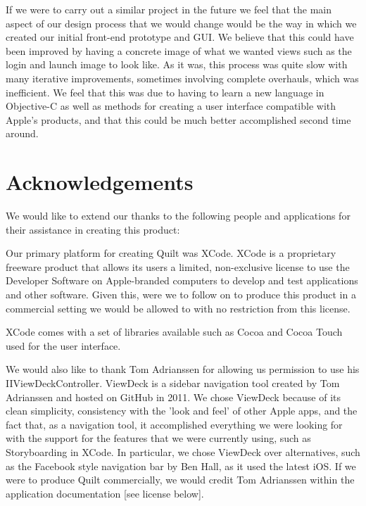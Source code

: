 \documentclass[a4wide, 10pt]{article}
\begin{document}
If we were to carry out a similar project in the future we feel that the main aspect of our design process that we would change would be the way in which we created our initial front-end prototype and GUI. We believe that this could have been improved by having a concrete image of what we wanted views such as the login and launch image to look like. As it was, this process was quite slow with many iterative improvements, sometimes involving complete overhauls, which was inefficient. We feel that this was due to having to learn a new language in Objective-C as well as methods for creating a user interface compatible with Apple's products, and that this could be much better accomplished second time around. 
	
\section{Acknowledgements}

We would like to extend our thanks to the following people and applications for their assistance in creating this product:

Our primary platform for creating Quilt was XCode. XCode is a proprietary freeware product that allows its users a limited, non-exclusive license to use the Developer Software on Apple-branded computers to develop and test applications and other software. Given this, were we to follow on to produce this product in a commercial setting we would be allowed to with no restriction from this license.

XCode comes with a set of libraries available such as Cocoa and Cocoa Touch used for the user interface. 



We would also like to thank Tom Adrianssen for allowing us permission to use his IIViewDeckController. ViewDeck is a sidebar navigation tool created by Tom Adrianssen and hosted on GitHub in 2011. We chose ViewDeck because of its clean simplicity, consistency with the 'look and feel' of other Apple apps, and the fact that, as a navigation tool, it accomplished everything we were looking for with the support for the features that we were currently using, such as Storyboarding in XCode. In particular, we chose ViewDeck over alternatives, such as the Facebook style navigation bar by Ben Hall, as it used the latest iOS. If we were to produce Quilt commercially, we would credit Tom Adrianssen within the application documentation [see license below].
\end{document}
